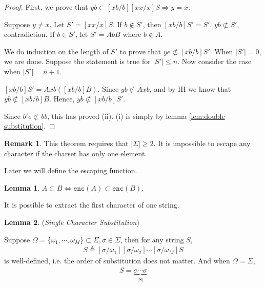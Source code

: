 \documentclass{article}
\theoremstyle{definition}
\newtheorem{lemma}{Lemma}[section]
\newtheorem*{remark}{Remark}
\begin{document}
\begin{proof}
    First, we prove that $yb \subset [xb/b][xx/x]S \Rightarrow y=x$.

    Suppose $y\neq x$. Let $S' = [xx/x]S$. If $b\notin S'$, then $[xb/b]S'=S'$. $yb \not\subset S'$, contradiction. If $b\in S'$, let $S'=AbB$ where $b\notin A$.

    We do induction on the length of $S'$ to prove that $ye \not\subset [xb/b]S'$. When $|S'|=0$, we are done. Suppose the statement is true for $|S'|\leq n$. Now consider the case when $|S'|=n+1$.

    $[xb/b]S' = Axb([xb/b]B)$. Since $yb \not\subset Axb$, and by IH we know that $yb \not\subset [xb/b]B$. Hence, $yb \not\subset [xb/b]S'$.

    Since $b'e\not\subset bb$, this has proved (ii). (i) is simply by lemma \ref{lem:double substitution}.
\end{proof}

\begin{remark}
    This theorem requires that $|\Sigma|\geq 2$. It is impossible to escape any character if the charset has only one element.
\end{remark}

Later we will define the escaping function.

\begin{lemma}
    $A\subset B\Leftrightarrow \mathtt{enc}(A)\subset \mathtt{enc}(B)$.
\end{lemma}

It is possible to extract the first character of one string.

\begin{lemma}
    (\emph{Single Character Substitution})

    Suppose $\Omega  = \{\omega_1,\cdots,\omega_M\}\subset \Sigma,\sigma \in \Sigma$, then for any string $S$,
    \begin{align}
        [\sigma/\Omega]S \triangleq [\sigma/\omega_1][\sigma/\omega_2]\cdots[\sigma/\omega_M]S
    \end{align}
    is well-defined, i.e. the order of substitution does not matter. And when $\Omega=\Sigma$,
    \begin{align}
        [\sigma/\Sigma]S = \underbrace{\sigma\cdots\sigma}_{|S|}
    \end{align}
    \label{lem:single character substitution}
\end{lemma}
\end{document}
